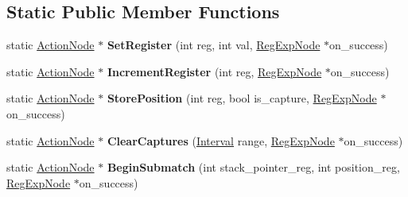 \subsection*{Static Public Member Functions}
\begin{DoxyCompactItemize}
\item 
\hypertarget{classv8_1_1internal_1_1_action_node_ab0232aafb29641c830970993c18ca5a7}{}static \hyperlink{classv8_1_1internal_1_1_action_node}{Action\+Node} $\ast$ {\bfseries Set\+Register} (int reg, int val, \hyperlink{classv8_1_1internal_1_1_reg_exp_node}{Reg\+Exp\+Node} $\ast$on\+\_\+success)\label{classv8_1_1internal_1_1_action_node_ab0232aafb29641c830970993c18ca5a7}

\item 
\hypertarget{classv8_1_1internal_1_1_action_node_ac2fea920241e4412a3bba2d10acb91ef}{}static \hyperlink{classv8_1_1internal_1_1_action_node}{Action\+Node} $\ast$ {\bfseries Increment\+Register} (int reg, \hyperlink{classv8_1_1internal_1_1_reg_exp_node}{Reg\+Exp\+Node} $\ast$on\+\_\+success)\label{classv8_1_1internal_1_1_action_node_ac2fea920241e4412a3bba2d10acb91ef}

\item 
\hypertarget{classv8_1_1internal_1_1_action_node_a7b7c1ea99df9360c97a7e73e2672a834}{}static \hyperlink{classv8_1_1internal_1_1_action_node}{Action\+Node} $\ast$ {\bfseries Store\+Position} (int reg, bool is\+\_\+capture, \hyperlink{classv8_1_1internal_1_1_reg_exp_node}{Reg\+Exp\+Node} $\ast$on\+\_\+success)\label{classv8_1_1internal_1_1_action_node_a7b7c1ea99df9360c97a7e73e2672a834}

\item 
\hypertarget{classv8_1_1internal_1_1_action_node_af5c152a32e7afbe31390f57c07eed05a}{}static \hyperlink{classv8_1_1internal_1_1_action_node}{Action\+Node} $\ast$ {\bfseries Clear\+Captures} (\hyperlink{classv8_1_1internal_1_1_interval}{Interval} range, \hyperlink{classv8_1_1internal_1_1_reg_exp_node}{Reg\+Exp\+Node} $\ast$on\+\_\+success)\label{classv8_1_1internal_1_1_action_node_af5c152a32e7afbe31390f57c07eed05a}

\item 
\hypertarget{classv8_1_1internal_1_1_action_node_a84297f33bee6dffd0cc7a6b5341fb106}{}static \hyperlink{classv8_1_1internal_1_1_action_node}{Action\+Node} $\ast$ {\bfseries Begin\+Submatch} (int stack\+\_\+pointer\+\_\+reg, int position\+\_\+reg, \hyperlink{classv8_1_1internal_1_1_reg_exp_node}{Reg\+Exp\+Node} $\ast$on\+\_\+success)\label{classv8_1_1internal_1_1_action_node_a84297f33bee6dffd0cc7a6b5341fb106}


\end{DoxyCompactItemize}
